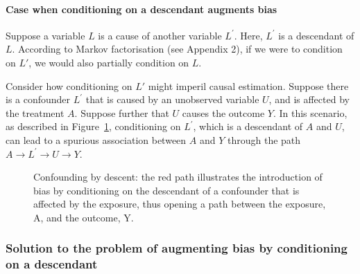 \documentclass[
  singlecolumn,
  9pt]{article}
\let\oldparagraph\paragraph
\renewcommand{\paragraph}[1]{\oldparagraph{#1}\mbox{}}
\begin{document}
\paragraph{Case when conditioning on a descendant augments
bias}\label{case-when-conditioning-on-a-descendant-augments-bias}

Suppose a variable \(L\) is a cause of another variable \(L^\prime\).
Here, \(L^\prime\) is a descendant of \(L\). According to Markov
factorisation (see Appendix 2), if we were to condition on \(L\prime\),
we would also partially condition on \(L\).

Consider how conditioning on \(L\prime\) might imperil causal
estimation. Suppose there is a confounder \(L^\prime\) that is caused by
an unobserved variable \(U\), and is affected by the treatment \(A\).
Suppose further that \(U\) causes the outcome \(Y\). In this scenario,
as described in Figure~\ref{fig-dag-descendent}, conditioning on
\(L^\prime\), which is a descendant of \(A\) and \(U\), can lead to a
spurious association between \(A\) and \(Y\) through the path
\(A \to L^\prime \to U \to Y\).

\begin{figure}


\caption{\label{fig-dag-descendent}Confounding by descent: the red path
illustrates the introduction of bias by conditioning on the descendant
of a confounder that is affected by the exposure, thus opening a path
between the exposure, A, and the outcome, Y.}

\end{figure}%

\subsubsection{Solution to the problem of augmenting bias by
conditioning on a
descendant}\label{solution-to-the-problem-of-augmenting-bias-by-conditioning-on-a-descendant}
\end{document}
